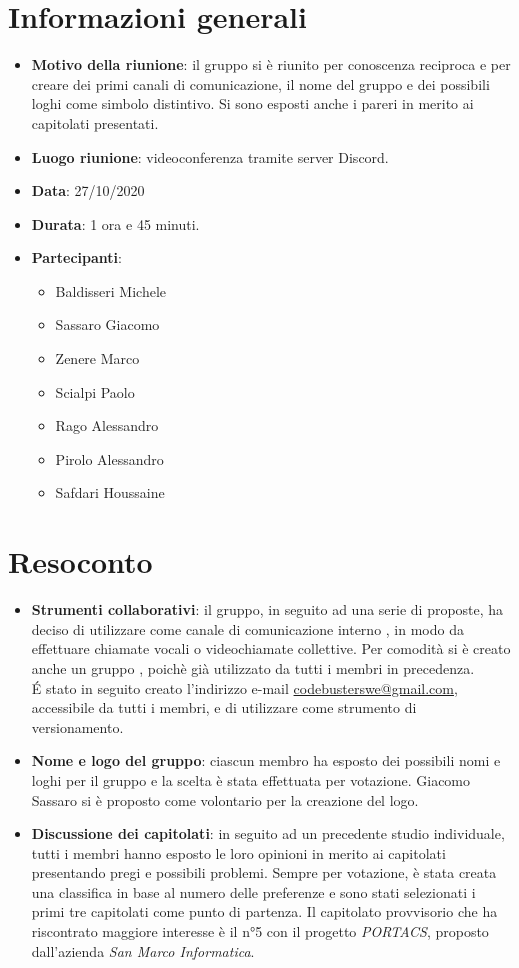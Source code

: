 \section{Informazioni generali}
\begin{itemize}
\item \textbf{Motivo della riunione}: il gruppo si è riunito per conoscenza reciproca e per creare dei primi canali di comunicazione, il nome del gruppo e dei possibili loghi come simbolo distintivo. Si sono esposti anche i pareri in merito ai capitolati presentati.
\item \textbf{Luogo riunione}: videoconferenza tramite server Discord.
\item \textbf{Data}: 27/10/2020
\item \textbf{Durata}: 1 ora e 45 minuti.
\item \textbf{Partecipanti}:
	\begin{itemize}
	\item Baldisseri Michele
	\item Sassaro Giacomo
	\item Zenere Marco
	\item Scialpi Paolo
	\item Rago Alessandro
	\item Pirolo Alessandro
	\item Safdari Houssaine
	\end{itemize}
\end{itemize}
\newpage
\section{Resoconto}
\begin{itemize}
\item \textbf{Strumenti collaborativi}: il gruppo, in seguito ad una serie di proposte, ha deciso di utilizzare come canale di comunicazione interno , in modo da effettuare chiamate vocali o videochiamate collettive. Per comodità si è creato anche un gruppo , poichè già utilizzato da tutti i membri in precedenza.\\ \'E stato in seguito creato l'indirizzo e-mail \href{mailto:codebusterswe@gmail.com}{\color{cyan}codebusterswe@gmail.com}, accessibile da tutti i membri, e di utilizzare  come strumento di versionamento.

\item \textbf{Nome e logo del gruppo}: ciascun membro ha esposto dei possibili nomi e loghi per il gruppo e la scelta è stata effettuata per votazione. Giacomo Sassaro si è proposto come volontario per la creazione del logo.

\item \textbf{Discussione dei capitolati}: in seguito ad un precedente studio individuale, tutti i membri hanno esposto le loro opinioni in merito ai capitolati presentando pregi e possibili problemi. Sempre per votazione, è stata creata una classifica in base al numero delle preferenze e sono stati selezionati i primi tre capitolati come punto di partenza. Il capitolato provvisorio che ha riscontrato maggiore interesse è il n°5 con il progetto \textit{PORTACS}, proposto dall'azienda \textit{San Marco Informatica}.
\end{itemize}